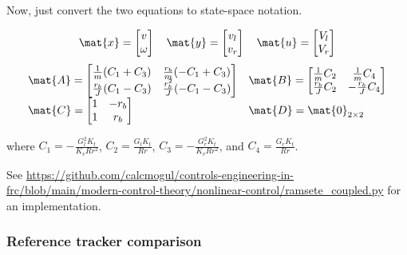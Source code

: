 Now, just convert the two equations to state-space notation.
\begin{theorem}
  \label{thm:ramsete_coupled_ref_tracker}
  \begin{equation*}
    \mat{x} =
    \begin{bmatrix}
      v \\
      \omega
    \end{bmatrix}
    \quad
    \mat{y} =
    \begin{bmatrix}
      v_l \\
      v_r
    \end{bmatrix}
    \quad
    \mat{u} =
    \begin{bmatrix}
      V_l \\
      V_r
    \end{bmatrix}
  \end{equation*}
  \begin{equation}
    \begin{array}{ll}
      \mat{A} =
      \begin{bmatrix}
        \frac{1}{m}(C_1 + C_3) & \frac{r_b}{m}(-C_1 + C_3) \\
        \frac{r_b}{J}(C_1 - C_3) & \frac{r_b^2}{J}(-C_1 - C_3)
      \end{bmatrix} &
      \mat{B} =
      \begin{bmatrix}
        \frac{1}{m}C_2 & \frac{1}{m}C_4 \\
        \frac{r_b}{J}C_2 & -\frac{r_b}{J}C_4
      \end{bmatrix} \\
      \mat{C} =
      \begin{bmatrix}
        1 & -r_b \\
        1 & r_b
      \end{bmatrix} &
      \mat{D} = \mat{0}_{2 \times 2}
    \end{array}
  \end{equation}

  where $C_1 = -\frac{G_l^2 K_t}{K_v R r^2}$, $C_2 = \frac{G_l K_t}{Rr}$,
  $C_3 = -\frac{G_r^2 K_t}{K_v R r^2}$, and $C_4 = \frac{G_r K_t}{Rr}$.
\end{theorem}

See
\url{https://github.com/calcmogul/controls-engineering-in-frc/blob/main/modern-control-theory/nonlinear-control/ramsete_coupled.py}
for an implementation.

\subsubsection{Reference tracker comparison}

